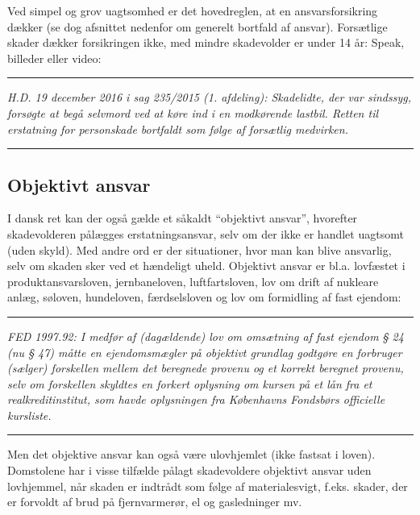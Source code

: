 \documentclass[]{book}
\begin{document}
Ved simpel og grov uagtsomhed er det hovedreglen, at en ansvarsforsikring dækker (se dog afsnittet nedenfor om generelt bortfald af ansvar). Forsætlige skader dækker forsikringen ikke, med mindre skadevolder er under 14 år:
Speak, billeder eller video:

\begin{center}\rule{0.5\linewidth}{\linethickness}\end{center}

\emph{H.D. 19 december 2016 i sag 235/2015 (1. afdeling): Skadelidte, der var sindssyg, forsøgte at begå selvmord ved at køre ind i en modkørende lastbil. Retten til erstatning for personskade bortfaldt som følge af forsætlig medvirken.}

\begin{center}\rule{0.5\linewidth}{\linethickness}\end{center}

\hypertarget{objektivt-ansvar}{%
\subsection{Objektivt ansvar}\label{objektivt-ansvar}}

I dansk ret kan der også gælde et såkaldt ``objektivt ansvar'', hvorefter skadevolderen pålægges erstatningsansvar, selv om der ikke er handlet uagtsomt (uden skyld). Med andre ord er der situationer, hvor man kan blive ansvarlig, selv om skaden sker ved et hændeligt uheld. Objektivt ansvar er bl.a. lovfæstet i produktansvarsloven, jernbaneloven, luftfartsloven, lov om drift af nukleare anlæg, søloven, hundeloven, færdselsloven og lov om formidling af fast ejendom:

\begin{center}\rule{0.5\linewidth}{\linethickness}\end{center}

\emph{FED 1997.92: I medfør af (dagældende) lov om omsætning af fast ejendom § 24 (nu § 47) måtte en ejendomsmægler på objektivt grundlag godtgøre en forbruger (sælger) forskellen mellem det beregnede provenu og et korrekt beregnet provenu, selv om forskellen skyldtes en forkert oplysning om kursen på et lån fra et realkreditinstitut, som havde oplysningen fra Københavns Fondsbørs officielle kursliste.}

\begin{center}\rule{0.5\linewidth}{\linethickness}\end{center}

Men det objektive ansvar kan også være ulovhjemlet (ikke fastsat i loven). Domstolene har i visse tilfælde pålagt skadevoldere objektivt ansvar uden lovhjemmel, når skaden er indtrådt som følge af materialesvigt, f.eks. skader, der er forvoldt af brud på fjernvarmerør, el og gasledninger mv.
\end{document}
